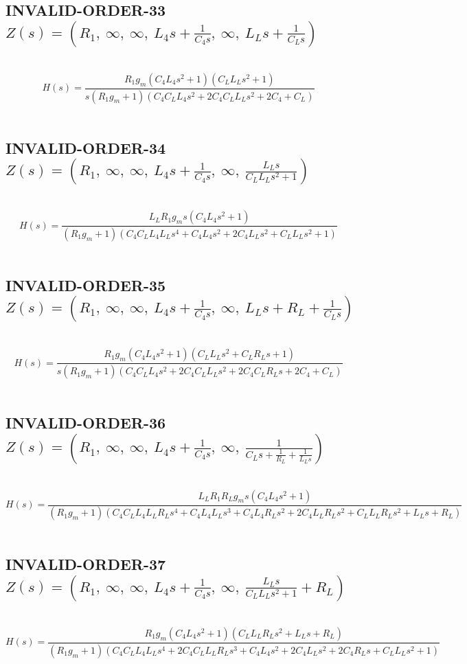 \documentclass{article}
\begin{document}
\subsection{INVALID-ORDER-33 $Z(s) = \left( R_{1}, \  \infty, \  \infty, \  L_{4} s + \frac{1}{C_{4} s}, \  \infty, \  L_{L} s + \frac{1}{C_{L} s}\right)$ } \ 
\textbf{\[H(s) = \frac{R_{1} g_{m} \left(C_{4} L_{4} s^{2} + 1\right) \left(C_{L} L_{L} s^{2} + 1\right)}{s \left(R_{1} g_{m} + 1\right) \left(C_{4} C_{L} L_{4} s^{2} + 2 C_{4} C_{L} L_{L} s^{2} + 2 C_{4} + C_{L}\right)}\] } \ 
\subsection{INVALID-ORDER-34 $Z(s) = \left( R_{1}, \  \infty, \  \infty, \  L_{4} s + \frac{1}{C_{4} s}, \  \infty, \  \frac{L_{L} s}{C_{L} L_{L} s^{2} + 1}\right)$ } \ 
\textbf{\[H(s) = \frac{L_{L} R_{1} g_{m} s \left(C_{4} L_{4} s^{2} + 1\right)}{\left(R_{1} g_{m} + 1\right) \left(C_{4} C_{L} L_{4} L_{L} s^{4} + C_{4} L_{4} s^{2} + 2 C_{4} L_{L} s^{2} + C_{L} L_{L} s^{2} + 1\right)}\] } \ 
\subsection{INVALID-ORDER-35 $Z(s) = \left( R_{1}, \  \infty, \  \infty, \  L_{4} s + \frac{1}{C_{4} s}, \  \infty, \  L_{L} s + R_{L} + \frac{1}{C_{L} s}\right)$ } \ 
\textbf{\[H(s) = \frac{R_{1} g_{m} \left(C_{4} L_{4} s^{2} + 1\right) \left(C_{L} L_{L} s^{2} + C_{L} R_{L} s + 1\right)}{s \left(R_{1} g_{m} + 1\right) \left(C_{4} C_{L} L_{4} s^{2} + 2 C_{4} C_{L} L_{L} s^{2} + 2 C_{4} C_{L} R_{L} s + 2 C_{4} + C_{L}\right)}\] } \ 
\subsection{INVALID-ORDER-36 $Z(s) = \left( R_{1}, \  \infty, \  \infty, \  L_{4} s + \frac{1}{C_{4} s}, \  \infty, \  \frac{1}{C_{L} s + \frac{1}{R_{L}} + \frac{1}{L_{L} s}}\right)$ } \ 
\textbf{\[H(s) = \frac{L_{L} R_{1} R_{L} g_{m} s \left(C_{4} L_{4} s^{2} + 1\right)}{\left(R_{1} g_{m} + 1\right) \left(C_{4} C_{L} L_{4} L_{L} R_{L} s^{4} + C_{4} L_{4} L_{L} s^{3} + C_{4} L_{4} R_{L} s^{2} + 2 C_{4} L_{L} R_{L} s^{2} + C_{L} L_{L} R_{L} s^{2} + L_{L} s + R_{L}\right)}\] } \ 
\subsection{INVALID-ORDER-37 $Z(s) = \left( R_{1}, \  \infty, \  \infty, \  L_{4} s + \frac{1}{C_{4} s}, \  \infty, \  \frac{L_{L} s}{C_{L} L_{L} s^{2} + 1} + R_{L}\right)$ } \ 
\textbf{\[H(s) = \frac{R_{1} g_{m} \left(C_{4} L_{4} s^{2} + 1\right) \left(C_{L} L_{L} R_{L} s^{2} + L_{L} s + R_{L}\right)}{\left(R_{1} g_{m} + 1\right) \left(C_{4} C_{L} L_{4} L_{L} s^{4} + 2 C_{4} C_{L} L_{L} R_{L} s^{3} + C_{4} L_{4} s^{2} + 2 C_{4} L_{L} s^{2} + 2 C_{4} R_{L} s + C_{L} L_{L} s^{2} + 1\right)}\] } \ 
\end{document}
